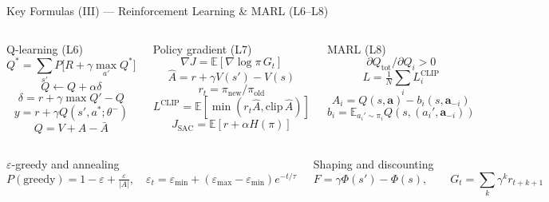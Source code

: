 \documentclass[aspectratio=169,10pt,t]{beamer}
\begin{document}
\begin{frame}{Key Formulas (III) --- Reinforcement Learning \& MARL (L6--L8)}
\begin{columns}[T]
\begin{fbx}{Q-learning (L6)}\[Q^{*}=\sum_{s'}P\big[R+\gamma\max_{a'}Q^{*}\big]\]\[Q\leftarrow Q+\alpha\delta\]\[\delta=r+\gamma\max Q'-Q\]\[y=r+\gamma Q(s',a^{*};\theta^{-})\]\[Q=V+A-\bar A\]\end{fbx}
\begin{fbx}{Policy gradient (L7)}\[\nabla J=\mathbb E[\nabla\log\pi\,G_t]\]\[\hat A=r+\gamma V(s')-V(s)\]\[r_t=\pi_{\text{new}}/\pi_{\text{old}}\]\[L^{\text{CLIP}}=\mathbb E[\min(r_t\hat A,\text{clip}\,\hat A)]\]\[J_{\text{SAC}}=\mathbb E[r+\alpha H(\pi)]\]\end{fbx}
\begin{fbx}{MARL (L8)}\[\partial Q_{\text{tot}}/\partial Q_i>0\]\[L=\tfrac1N\sum_iL_i^{\text{CLIP}}\]\[A_i=Q(s,\mathbf a)-b_i(s,\mathbf a_{-i})\]\[b_i=\mathbb E_{a_i'\sim\pi_i}Q(s,(a_i',\mathbf a_{-i}))\]\end{fbx}
\end{columns}
\begin{columns}[T]
\begin{fbx}{$\varepsilon$-greedy and annealing}\[P(\text{greedy})=1-\varepsilon+\tfrac{\varepsilon}{|A|},\quad\varepsilon_t=\varepsilon_{\min}+(\varepsilon_{\max}-\varepsilon_{\min})e^{-t/\tau}\]\end{fbx}
\begin{fbx}{Shaping and discounting}\[F=\gamma\Phi(s')-\Phi(s),\qquad G_t=\sum_k\gamma^kr_{t+k+1}\]\end{fbx}
\end{columns}
\end{frame}
\end{document}
